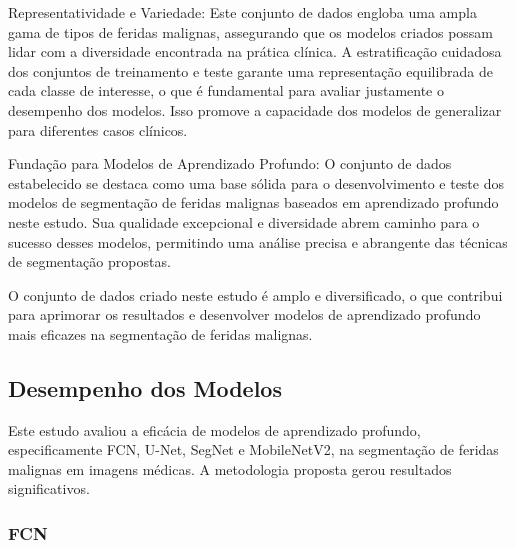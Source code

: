     Representatividade e Variedade: Este conjunto de dados engloba uma ampla gama de tipos de feridas malignas, assegurando que os modelos criados possam lidar com a diversidade encontrada na prática clínica. A estratificação cuidadosa dos conjuntos de treinamento e teste garante uma representação equilibrada de cada classe de interesse, o que é fundamental para avaliar justamente o desempenho dos modelos. Isso promove a capacidade dos modelos de generalizar para diferentes casos clínicos.
    
    Fundação para Modelos de Aprendizado Profundo: O conjunto de dados estabelecido se destaca como uma base sólida para o desenvolvimento e teste dos modelos de segmentação de feridas malignas baseados em aprendizado profundo neste estudo. Sua qualidade excepcional e diversidade abrem caminho para o sucesso desses modelos, permitindo uma análise precisa e abrangente das técnicas de segmentação propostas.

    O conjunto de dados criado neste estudo é amplo e diversificado, o que contribui para aprimorar os resultados e desenvolver modelos de aprendizado profundo mais eficazes na segmentação de feridas malignas.

\subsection{Desempenho dos Modelos}

    
    
    Este estudo avaliou a eficácia de modelos de aprendizado profundo, especificamente \ac{FCN}, \ac{U-Net}, \ac{SegNet} e \ac{MobileNetV2}, na segmentação de feridas malignas em imagens médicas. A metodologia proposta gerou resultados significativos.
    
    \subsubsection{FCN}


